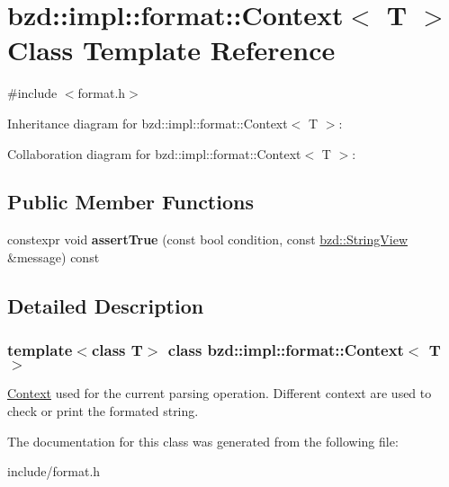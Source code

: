 \hypertarget{classbzd_1_1impl_1_1format_1_1Context}{}\section{bzd\+:\+:impl\+:\+:format\+:\+:Context$<$ T $>$ Class Template Reference}
\label{classbzd_1_1impl_1_1format_1_1Context}


{\ttfamily \#include $<$format.\+h$>$}



Inheritance diagram for bzd\+:\+:impl\+:\+:format\+:\+:Context$<$ T $>$\+:


Collaboration diagram for bzd\+:\+:impl\+:\+:format\+:\+:Context$<$ T $>$\+:
\subsection*{Public Member Functions}
\begin{DoxyCompactItemize}
\item 
\mbox{\label{classbzd_1_1impl_1_1format_1_1Context_a642d39e5e5faf32323b43c3677e85f5f}} 
constexpr void {\bfseries assert\+True} (const bool condition, const \hyperlink{classbzd_1_1impl_1_1StringView}{bzd\+::\+String\+View} \&message) const
\end{DoxyCompactItemize}


\subsection{Detailed Description}
\subsubsection*{template$<$class T$>$\newline
class bzd\+::impl\+::format\+::\+Context$<$ T $>$}

\hyperlink{classbzd_1_1impl_1_1format_1_1Context}{Context} used for the current parsing operation. Different context are used to check or print the formated string. 

The documentation for this class was generated from the following file\+:\begin{DoxyCompactItemize}
\item 
include/format.\+h\end{DoxyCompactItemize}
